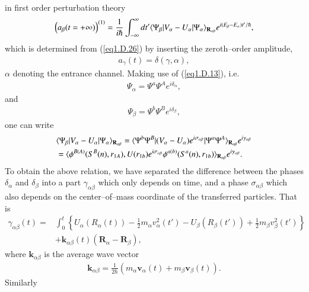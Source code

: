 \begin{subappendices}
 in first order perturbation theory
  \begin{align}\label{eq1.D.29}
\left(a_\beta(t=+\infty)\right)^{(1)}=\frac{1}{i\hbar}\int_{-\infty}^{\infty}dt'\langle {\Psi_\beta|V_\alpha-U_\alpha|\Psi_\alpha} \rangle_{\mathbf R_{\alpha\beta}}e^{i(E_\beta-E_\alpha)t'/\hbar},
  \end{align}
 which is determined from (\ref{eq1.D.26}) by inserting the zeroth--order amplitude,
  \begin{align}\label{eq1.D.30}
a_{\gamma}(t)=\delta(\gamma,\alpha),
  \end{align}
 $\alpha$ denoting the entrance channel. Making use of (\ref{eq1.D.13}), i.e.
   \begin{align}\label{eq1.D.31}
\Psi_\alpha=\Psi^a\Psi^Ae^{i\delta_\alpha},
   \end{align}
 and
    \begin{align}\label{eq1.D.32}
 \Psi_\beta=\Psi^b\Psi^Be^{i\delta_\beta},
    \end{align}
 one can write
    \begin{align}\label{eq1.D.33}
\nonumber &\langle {\Psi_\beta|V_\alpha-U_\alpha|\Psi_\alpha} \rangle_{\mathbf R_{\alpha\beta}}=\langle {\Psi^b\Psi^B|(V_\alpha-U_\alpha)e^{i\sigma_{\alpha\beta}}|\Psi^a\Psi^A} \rangle_{\mathbf R_{\alpha\beta}}e^{i\gamma_{\alpha\beta}}\\
&=\langle {\phi^{B(A)}(S^B(n),r_{1A}),U(r_{1b})e^{i\sigma_{\alpha\beta}}\phi^{a(b)}(S^a(n),r_{1b})} \rangle_{\mathbf R_{\alpha\beta}}e^{i\gamma_{\alpha\beta}}.
    \end{align}
 To obtain the above relation, we have separated the difference between the phases $\delta_\alpha$ and $\delta_\beta$ into a part $\gamma_{\alpha\beta}$ which only depends on time, and a phase $\sigma_{\alpha\beta}$ which also depends on the center--of--mass coordinate of the transferred particles. That is
\begin{align}\label{eq1.D.34}
\nonumber \gamma_{\alpha\beta}(t)=&\int_0^t\left\{U_\alpha( R_\alpha(t))-\frac{1}{2}m_\alpha v_\alpha^2(t')-U_\beta(R_\beta (t'))+\frac{1}{2}m_\beta v_\beta^2(t')\right\}\\
&+\mathbf k_{\alpha\beta}(t)(\mathbf R_\alpha-\mathbf R_\beta),
\end{align}
 where $\mathbf k_{\alpha\beta}$ is the average wave vector 
     \begin{align}\label{eq1.D.35}
\mathbf k_{\alpha\beta}=\frac{1}{2\hbar}\left(m_\alpha\mathbf v_\alpha(t)+m_\beta\mathbf v_\beta(t)\right).
     \end{align}
 Similarly

\end{subappendices}
